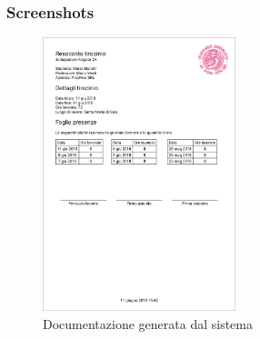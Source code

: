 \subsubsection{Screenshots}
\begin{figure}[H]
	\centering
	\includegraphics[width=0.5\textwidth]{Chapter3/Figs/screenshots/pdfdocs}     
	\caption[Screenshot: documentazione generata dal sistema]{Documentazione generata dal sistema}
	\label{fig:screenshot:10}
\end{figure}